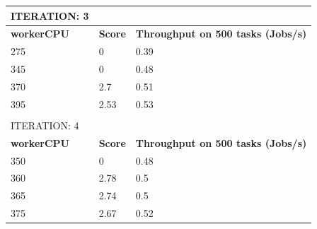 \begin{table}[H]
\begin{tabular}{lll}
ITERATION: 3                             &                                     &                                                  \\ \hline
\multicolumn{1}{|l|}{\textbf{workerCPU}} & \multicolumn{1}{l|}{\textbf{Score}} & \multicolumn{1}{l|}{\textbf{Throughput on 500 tasks (Jobs/s)}} \\ \hline
\multicolumn{1}{|l|}{275}                & \multicolumn{1}{l|}{0}              & \multicolumn{1}{l|}{0.39}                        \\ \hline
\multicolumn{1}{|l|}{345}                & \multicolumn{1}{l|}{0}              & \multicolumn{1}{l|}{0.48}                        \\ \hline
\multicolumn{1}{|l|}{370}                & \multicolumn{1}{l|}{2.7}            & \multicolumn{1}{l|}{0.51}                        \\ \hline
\multicolumn{1}{|l|}{395}                & \multicolumn{1}{l|}{2.53}           & \multicolumn{1}{l|}{0.53}                        \\ \hline
                                         &                                     &                                                  \\
ITERATION: 4                             &                                     &                                                  \\ \hline
\multicolumn{1}{|l|}{\textbf{workerCPU}} & \multicolumn{1}{l|}{\textbf{Score}} & \multicolumn{1}{l|}{\textbf{Throughput on 500 tasks (Jobs/s)}} \\ \hline
\multicolumn{1}{|l|}{350}                & \multicolumn{1}{l|}{0}              & \multicolumn{1}{l|}{0.48}                        \\ \hline
\multicolumn{1}{|l|}{360}                & \multicolumn{1}{l|}{2.78}           & \multicolumn{1}{l|}{0.5}                         \\ \hline
\multicolumn{1}{|l|}{365}                & \multicolumn{1}{l|}{2.74}           & \multicolumn{1}{l|}{0.5}                         \\ \hline
\multicolumn{1}{|l|}{375}                & \multicolumn{1}{l|}{2.67}           & \multicolumn{1}{l|}{0.52}                        \\ \hline
\end{tabular}
\end{table}


